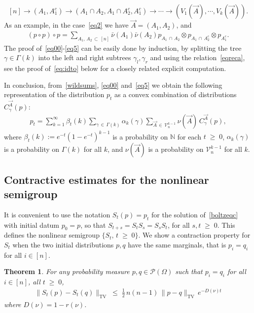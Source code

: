 \documentclass[10pt,a4paper]{article}
\newtheorem{theorem}{Theorem}[section]
\renewcommand{\leq}{\;\leqslant\;}
\renewcommand{\geq}{\;\geqslant\;}
\newcommand{\tv}{\mathrm{TV}}
\newcommand{\cP}{\mathcal{P}}
\newcommand{\cV}{\mathcal{V}}
\newcommand{\bbN}{\mathbb{N}}
\let\b=\beta
\let\g=\gamma
\let\G=\Gamma
\let\O=\Omega
\begin{document}
\[
[n]\to (A_1,A_1^c) \to (A_1\cap A_2,A_1\cap A_2^c,A_1^c)\to\cdots\to \left(V_1(\vec A),\cdots,V_k(\vec A)\right).
\]
As an example, in the case~\eqref{eq2} we have $\vec A=(A_1,A_2)$, and
\begin{align}
(p \circ p)\circ p = \sum_{A_1,\,A_2 \,\subset\,[n]}\bar\nu(A_1)\bar\nu(A_2)p_{A_1\,\cap\,A_2}\otimes p_{A_1\,\cap\,A_2^c} \otimes p_{A_1^c}.
\end{align}
The proof of~\eqref{eq00}-\eqref{eq5} can be easily done by induction, by splitting the tree $\g\in\G(k)$ into the left and right subtrees $\g_l,\g_r$ and using the relation~\eqref{eqreca}, see the proof of~\eqref{eq:idto} below for a closely related explicit computation.

In conclusion, from~\eqref{wildsums}, \eqref{eq00} and~\eqref{eq5} we obtain the following representation of the distribution $p_t$ as a convex combination of distributions $C^{\vec A}_{\gamma}(p)$:
\begin{align}\label{eq0}
p_t=\sum_{k=1}^{\infty}\b_t(k)\sum_{\g\,\in \,\Gamma(k)}\alpha_k(\g)\sum_{\vec A\,\in\, \cV_n^{k-1}}\nu(\vec A) \,C^{\vec A}_{\gamma}(p),
\end{align}
where $\b_t(k) := e^{-t}(1-e^{-t})^{k-1}$ is a probability on $\bbN$ for each $t\geq 0$, $ \alpha_k(\g)$ is a probability on $\G(k)$ for all $k$, and $\nu(\vec A)$ is a probability on $\cV_n^{k-1}$ for all $k$.


\subsection{Contractive estimates for the nonlinear semigroup}

It is convenient to use the notation $S_t(p)=p_t$ for the solution of~\eqref{boltzeqc} with initial datum $p_0=p$, so that $S_{t+s}=S_tS_s=S_sS_t$, for all $s,t\geq 0$. This defines the nonlinear semigroup $\{S_t, \,t\geq 0\}$. We show a contraction property for $S_t$ when the two initial distributions $p,q$ have the same marginals, that is $p_i=q_i$ for all $i \in [n]$.

\begin{theorem}\label{contrlemma2}
For any probability measure $p,q \in \cP(\O)$ such that $p_{i} = q_{i}$ for all $i \in [n]$, all $t\geq 0$,
\begin{align}\label{nonlincont1}
\|S_t(p)-S_t(q)\|_\tv \leq \tfrac12\,n(n-1)\,\|p-q\|_\tv \,e^{-D(\nu) t}
\end{align}
where $D(\nu)=1-r(\nu)$.
\end{theorem}
\end{document}
